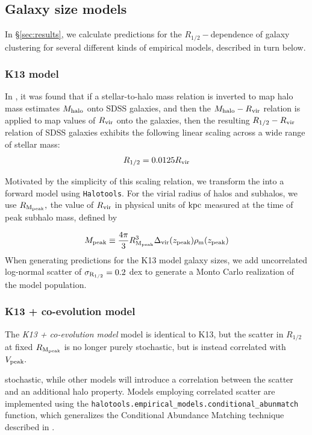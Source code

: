\documentclass[usenatbib,usegraphicx,letterpaper]{mn2e}
\newcommand{\beq}{\begin{equation}}
\newcommand{\eeq}{\end{equation}}
\newcommand{\rhalf}{R_{1/2}}
\newcommand{\sigmarhalf}{\sigma_{\rm R_{1/2}}}
\newcommand{\mpeak}{M_{\rm peak}}
\newcommand{\zpeak}{z_{\rm peak}}
\newcommand{\mhalo}{M_{\rm halo}}
\newcommand{\rvir}{R_{\rm vir}}
\newcommand{\rmpeak}{R_{\rm M_{peak}}}
\newcommand{\vmaxmpeak}{V_{\rm peak}}
\newcommand{\kpc}{{\rm kpc}}
\begin{document}
\subsection{Galaxy size models}
\label{subsec:model}

In \S\ref{sec:results}, we calculate predictions for the $\rhalf-$dependence of galaxy clustering for several different kinds of empirical models, described in turn below.


\subsubsection{K13 model}
\label{subsubsec:k13model}

In \citet{kravtsov13}, it was found that if a stellar-to-halo mass relation is inverted to map halo mass estimates $\mhalo$ onto SDSS galaxies, and then the $\mhalo-\rvir$ relation is applied to map values of $\rvir$ onto the galaxies, then the resulting $\rhalf-\rvir$ relation of SDSS galaxies exhibits the following linear scaling across a wide range of stellar mass:
\beq
\label{eq:fiducial_model}
\rhalf = 0.0125\rvir
\eeq

Motivated by the simplicity of this scaling relation, we transform the \citet{kravtsov13} into a forward model using {\tt Halotools}. For the virial radius of halos and subhalos, we use $\rmpeak,$ the value of $\rvir$ in physical units of $\kpc$ measured at the time of peak subhalo mass, defined by 

\beq
\mpeak\equiv\frac{4\pi}{3}\rmpeak^{3}\Delta_{\rm vir}(\zpeak)\rho_{\rm m}(\zpeak)
\eeq
When generating predictions for the K13 model galaxy sizes, we add uncorrelated log-normal scatter of $\sigmarhalf=0.2$ dex to generate a Monto Carlo realization of the model population. 

\subsubsection{K13 + co-evolution model}
\label{subsubsec:coevolutionmodel}

The {\em K13 + co-evolution model} model is identical to K13, but the scatter in $\rhalf$ at fixed $\rmpeak$ is no longer purely stochastic, but is instead correlated with $\vmaxmpeak.$

 stochastic, while other models will introduce a correlation between the scatter and an additional halo property. Models employing correlated scatter are implemented using the {\tt halotools.empirical\_models.conditional\_abunmatch} function, which generalizes the Conditional Abundance Matching technique described in \citet{hearin_etal13b}. 
\end{document}
